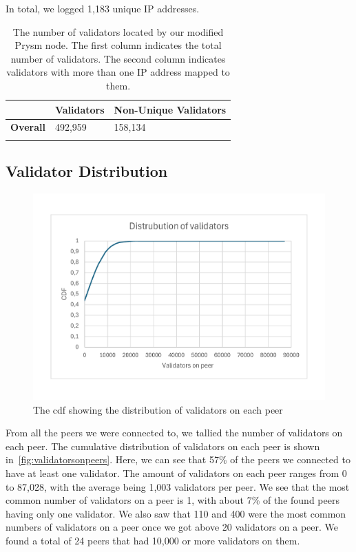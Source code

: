 In total, we logged 1,183 unique IP addresses.


\begin{table}[]
    \centering
    \caption{The number of validators located by our modified Prysm node. The first column indicates the total number of validators. The second column indicates validators with more than one IP address mapped to them.}
    \begin{tabular}{lll}
        \hline
        & \textbf{Validators} & \textbf{Non-Unique Validators} \\ \hline
        \textbf{Overall} & 492,959             & 158,134                        \\ \hline
        \\
    \end{tabular}
    \label{tab:unique vals}
\end{table}

\subsection{Validator Distribution}\label{subsec:validator-distribution}
\begin{figure}[!ht]
    \centering
    \includegraphics[scale = 0.45]{figures/distval}
    \caption{The cdf showing the distribution of validators on each peer}
    \label{fig:validatorsonpeers}
\end{figure}
From all the peers we were connected to, we tallied the number of validators on each peer.
The cumulative distribution of validators on each peer is shown in~\autoref{fig:validatorsonpeers}.
Here, we can see that 57\% of the peers we connected to have at least one validator.
The amount of validators on each peer ranges from 0 to 87,028, with the average being 1,003 validators per peer.
We see that the most common number of validators on a peer is 1, with about 7\% of the found peers having only one validator.
We also saw that 110 and 400 were the most common numbers of validators on a peer once we got above 20 validators on a peer.
We found a total of 24 peers that had 10,000 or more validators on them.